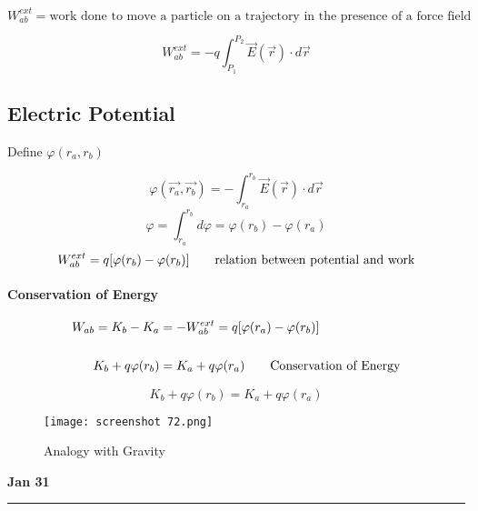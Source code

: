 \documentclass[svgnames]{article}   	%
\begin{document}
\[
  W_{ab}^{ext} = \text{work done to move a particle on a trajectory in the
  presence of a force field}
\]

\vspace{5px} \[
  W_{ab}^{ext} = -q\int_{P_1}^{P_2} \vec{E}(\vec{r}) \cdot d\vec{r} 
\] \vspace{5px}
\subsection{Electric Potential} 

Define $\varphi(r_a, r_b)$

\vspace{5px} \[
  \varphi(\vec{r_a}, \vec{r_b}) = -\int_{r_a}^{r_b} \vec{E}(\vec{r}) \cdot
  d\vec{r} 
\] \vspace{5px}
\[
  \varphi = \int_{r_a}^{r_b} d\varphi = \varphi(r_b) - \varphi(r_a) 
\]
\vspace{5px} \[
  W_{ab}^{ext} = q[\varphi(r_b) - \varphi(r_b)] \hspace{20px} \text{relation
  between potential and work}
\] \vspace{5px}

\paragraph{Conservation of Energy}

\begin{align*}
  W_{ab} = K_b - K_a  &= -W_{ab}^{ext} = q[\varphi(r_a) - \varphi(r_b)] \\\\
  K_b + q\varphi(r_b) &= K_a + q\varphi(r_a) \hspace{20px} \text{Conservation of
  Energy} 
\end{align*}

\begin{tcolorbox}[title = Conservation of Energy]

  \[
  K_b + q\varphi(r_b) = K_a + q\varphi(r_a)
  \]

\end{tcolorbox}

\begin{figure}[H]
  \centering
    \texttt{[image: screenshot 72.png]}
    \caption{Analogy with Gravity}
\end{figure}

\newpage

\noindent \textbf{Jan 31} \hrule
\vspace{10px}
\end{document}
